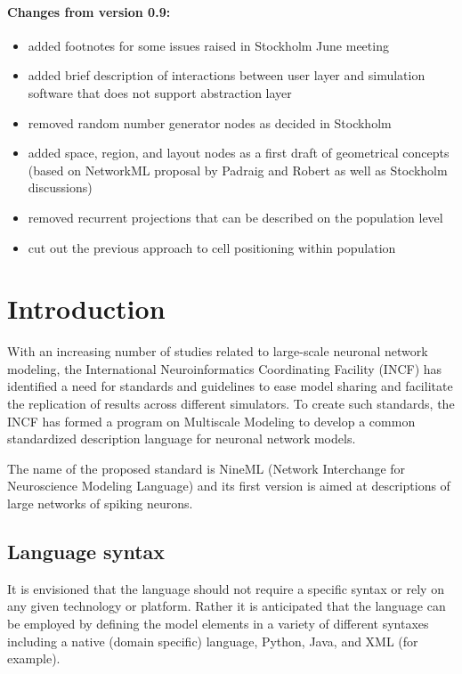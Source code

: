 \documentclass{article}
\begin{document}
\paragraph{Changes from version 0.9:}
\begin{itemize}
\item added footnotes for some issues raised in Stockholm June meeting
\item added brief description of interactions between user layer and
simulation software that does not support abstraction layer
\item removed random number generator nodes as decided in Stockholm
\item added space, region, and layout nodes as a first draft of geometrical
concepts (based on NetworkML proposal by Padraig and Robert as well as
Stockholm discussions)
\item removed recurrent projections that can be described on the population
level
\item cut out the previous approach to cell positioning within population
\end{itemize}
\newpage

\section{Introduction}

With an increasing number of studies related to large-scale neuronal
network modeling, the International Neuroinformatics Coordinating
Facility (INCF) has identified a need for standards and guidelines to
ease model sharing and facilitate the replication of results across
different simulators. To create such standards, the INCF has formed a
program on Multiscale Modeling to develop a common standardized
description language for neuronal network models.

The name of the proposed standard is NineML (Network Interchange for
Neuroscience Modeling Language) and its first version is aimed at
descriptions of large networks of spiking neurons.

\subsection{Language syntax}

It is envisioned that the language should not require a
specific syntax or rely on any given technology or platform.
Rather it is anticipated that the language can be
employed by defining the model elements in a variety of different
syntaxes including a native (domain specific) language, Python, Java,
and XML (for example).
\end{document}
